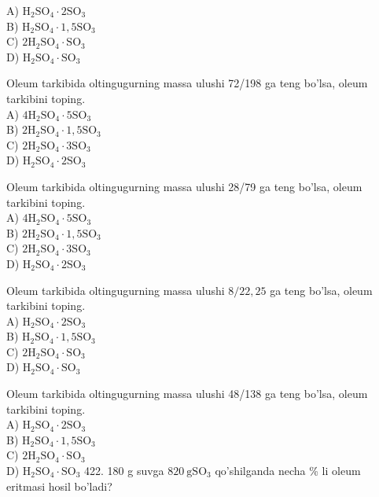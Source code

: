 A) $\mathrm{H}_{2} \mathrm{SO}_{4} \cdot 2 \mathrm{SO}_{3}$\\
B) $\mathrm{H}_{2} \mathrm{SO}_{4} \cdot 1,5 \mathrm{SO}_{3}$\\
C) $2 \mathrm{H}_{2} \mathrm{SO}_{4} \cdot \mathrm{SO}_{3}$\\
D) $\mathrm{H}_{2} \mathrm{SO}_{4} \cdot \mathrm{SO}_{3}$
  \item Oleum tarkibida oltingugurning massa ulushi 72/198 ga teng bo'lsa, oleum tarkibini toping.\\
A) $4 \mathrm{H}_{2} \mathrm{SO}_{4} \cdot 5 \mathrm{SO}_{3}$\\
B) $2 \mathrm{H}_{2} \mathrm{SO}_{4} \cdot 1,5 \mathrm{SO}_{3}$\\
C) $2 \mathrm{H}_{2} \mathrm{SO}_{4} \cdot 3 \mathrm{SO}_{3}$\\
D) $\mathrm{H}_{2} \mathrm{SO}_{4} \cdot 2 \mathrm{SO}_{3}$
  \item Oleum tarkibida oltingugurning massa ulushi 28/79 ga teng bo'lsa, oleum tarkibini toping.\\
A) $4 \mathrm{H}_{2} \mathrm{SO}_{4} \cdot 5 \mathrm{SO}_{3}$\\
B) $2 \mathrm{H}_{2} \mathrm{SO}_{4} \cdot 1,5 \mathrm{SO}_{3}$\\
C) $2 \mathrm{H}_{2} \mathrm{SO}_{4} \cdot 3 \mathrm{SO}_{3}$\\
D) $\mathrm{H}_{2} \mathrm{SO}_{4} \cdot 2 \mathrm{SO}_{3}$
  \item Oleum tarkibida oltingugurning massa ulushi $8 / 22,25$ ga teng bo'lsa, oleum tarkibini toping.\\
A) $\mathrm{H}_{2} \mathrm{SO}_{4} \cdot 2 \mathrm{SO}_{3}$\\
B) $\mathrm{H}_{2} \mathrm{SO}_{4} \cdot 1,5 \mathrm{SO}_{3}$\\
C) $2 \mathrm{H}_{2} \mathrm{SO}_{4} \cdot \mathrm{SO}_{3}$\\
D) $\mathrm{H}_{2} \mathrm{SO}_{4} \cdot \mathrm{SO}_{3}$
  \item Oleum tarkibida oltingugurning massa ulushi 48/138 ga teng bo'lsa, oleum tarkibini toping.\\
A) $\mathrm{H}_{2} \mathrm{SO}_{4} \cdot 2 \mathrm{SO}_{3}$\\
B) $\mathrm{H}_{2} \mathrm{SO}_{4} \cdot 1,5 \mathrm{SO}_{3}$\\
C) $2 \mathrm{H}_{2} \mathrm{SO}_{4} \cdot \mathrm{SO}_{3}$\\
D) $\mathrm{H}_{2} \mathrm{SO}_{4} \cdot \mathrm{SO}_{3}$
422. 180 g suvga $820 \mathrm{~g} \mathrm{SO}_{3}$ qo'shilganda necha \% li oleum eritmasi hosil bo'ladi?\\
